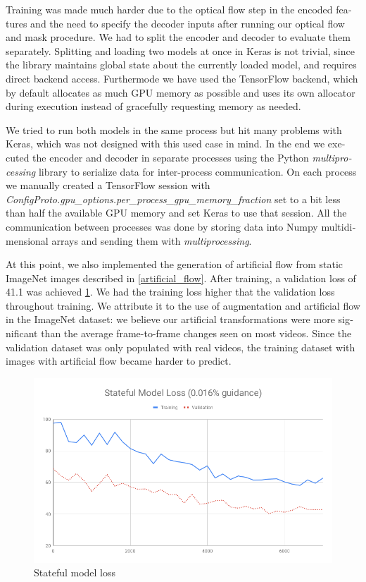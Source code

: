 \documentclass[12pt,openright,oneside,a4paper,english]{abntex2}
\begin{document}
\begin{otherlanguage}{english}
Training was made much harder due to the optical flow step in the encoded features and the need to specify the decoder inputs after running our optical flow and mask procedure. We had to split the encoder and decoder to evaluate them separately. Splitting and loading two models at once in Keras is not trivial, since the library maintains global state about the currently loaded model, and requires direct backend access. Furthermode we have used the TensorFlow backend, which by default allocates as much GPU memory as possible and uses its own allocator during execution instead of gracefully requesting memory as needed.

We tried to run both models in the same process but hit many problems with Keras, which was not designed with this used case in mind. In the end we executed the encoder and decoder in separate processes using the Python \textit{multiprocessing} library to serialize data for inter-process communication. On each process we manually created a TensorFlow session with \textit{ConfigProto.gpu\_options.per\_process\_gpu\_memory\_fraction} set to a bit less than half the available GPU memory and set Keras to use that session. All the communication between processes was done by storing data into Numpy multidimensional arrays and sending them with \textit{multiprocessing}.

At this point, we also implemented the generation of artificial flow from static ImageNet images described in \ref{artificial_flow}. After training, a validation loss of 41.1 was achieved \ref{loss_stateful}. We had the training loss higher that the validation loss throughout training. We attribute it to the use of augmentation and artificial flow in the ImageNet dataset: we believe our artificial transformations were more significant than the average frame-to-frame changes seen on most videos. Since the validation dataset was only populated with real videos, the training dataset with images with artificial flow became harder to predict.

\begin{figure}[!htb]
\centering
\includegraphics[width=\textwidth]{loss/Stateful}
\caption{Stateful model loss}
\label{loss_stateful}
\end{figure}


\end{otherlanguage}
\end{document}
